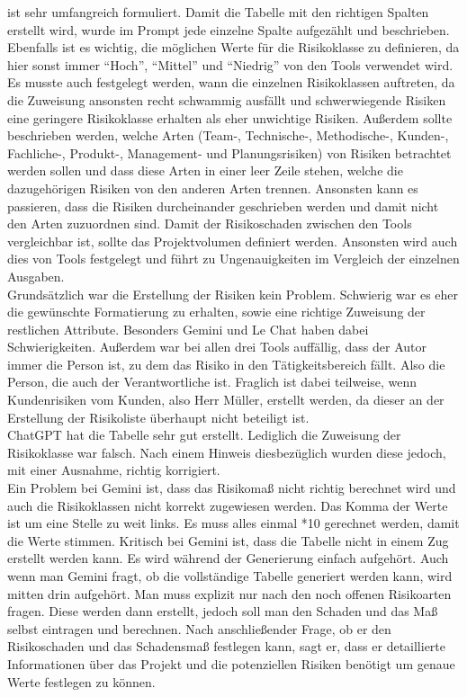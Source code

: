 ist sehr umfangreich formuliert. Damit die Tabelle mit den richtigen Spalten erstellt wird, wurde im Prompt jede
einzelne Spalte aufgezählt und beschrieben. Ebenfalls ist es wichtig, die möglichen Werte für die Risikoklasse zu 
definieren, da hier sonst immer ``Hoch'', ``Mittel'' und ``Niedrig'' von den Tools verwendet wird. Es musste auch 
festgelegt werden, wann die einzelnen Risikoklassen auftreten, da die Zuweisung ansonsten recht schwammig ausfällt und
schwerwiegende Risiken eine geringere Risikoklasse erhalten als eher unwichtige Risiken. Außerdem sollte beschrieben 
werden, welche Arten (Team-, Technische-, Methodische-, Kunden-, Fachliche-, Produkt-, Management- und Planungsrisiken) 
von Risiken betrachtet werden sollen und dass diese Arten in einer leer Zeile stehen, welche die dazugehörigen Risiken von 
den anderen Arten trennen. Ansonsten kann es passieren, dass die Risiken durcheinander geschrieben werden und damit nicht 
den Arten zuzuordnen sind. Damit der Risikoschaden zwischen den Tools vergleichbar ist, sollte das Projektvolumen definiert 
werden. Ansonsten wird auch dies von Tools festgelegt und führt zu Ungenauigkeiten im Vergleich der einzelnen Ausgaben.\\

Grundsätzlich war die Erstellung der Risiken kein Problem. Schwierig war es eher die gewünschte Formatierung zu erhalten, 
sowie eine richtige Zuweisung der restlichen Attribute. Besonders Gemini und Le Chat haben dabei Schwierigkeiten. 
Außerdem war bei allen drei Tools auffällig, dass der Autor immer die Person ist, zu dem das Risiko in den 
Tätigkeitsbereich fällt. Also die Person, die auch der Verantwortliche ist. Fraglich ist dabei teilweise, wenn 
Kundenrisiken vom Kunden, also Herr Müller, erstellt werden, da dieser an der Erstellung der Risikoliste überhaupt 
nicht beteiligt ist.\\

ChatGPT hat die Tabelle sehr gut erstellt. Lediglich die Zuweisung der Risikoklasse war falsch. Nach einem Hinweis 
diesbezüglich wurden diese jedoch, mit einer Ausnahme, richtig korrigiert.\\

Ein Problem bei Gemini ist, dass das Risikomaß nicht richtig berechnet wird und auch die Risikoklassen nicht korrekt 
zugewiesen werden. Das Komma der Werte ist um eine Stelle zu weit links. Es muss alles einmal *10 gerechnet werden, damit die 
Werte stimmen. Kritisch bei Gemini ist, dass die Tabelle nicht in einem Zug erstellt werden kann. Es wird während der 
Generierung einfach aufgehört. Auch wenn man Gemini fragt, ob die vollständige Tabelle generiert werden kann, wird mitten 
drin aufgehört. Man muss explizit nur nach den noch offenen Risikoarten fragen. Diese werden dann erstellt, jedoch soll man 
den Schaden und das Maß selbst eintragen und berechnen. Nach anschließender Frage, ob er den Risikoschaden und das Schadensmaß 
festlegen kann, sagt er, dass er detaillierte Informationen über das Projekt und die potenziellen Risiken benötigt um genaue Werte 
festlegen zu können.\\


